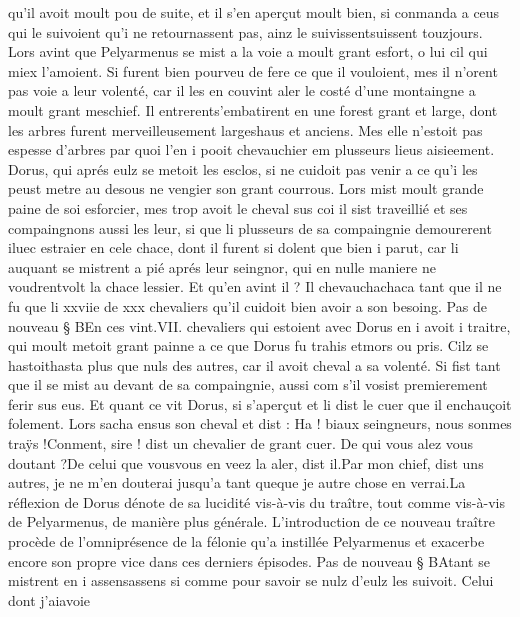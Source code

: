 \documentclass{article}
\begin{document}
\begin{pages}
   qu’il avoit moult pou de suite, et il s’en aperçut moult bien, si conmanda a ceus qui le suivoient qu’i ne retournassent pas, 
   ainz le suivissentsuissent touzjours. Lors avint que 
   Pelyarmenus se mist a la voie a moult grant esfort, o lui cil qui miex l’amoient. 
   Si furent bien pourveu de fere ce que il vouloient, mes il n’orent pas voie a leur volenté, car il les 
   en couvint aler le costé d’une montaingne a moult grant meschief. 
   Il entrerents'embatirent en une forest grant et large, dont les arbres 
   furent merveilleusement largeshaus et anciens. Mes elle n’estoit pas espesse 
   d’arbres par quoi l’en i pooit chevauchier em plusseurs lieus aisieement. 
   Dorus, qui aprés eulz se metoit les esclos, si ne cuidoit pas venir a ce qu’i les peust metre 
   au desous ne vengier son grant courrous. Lors mist moult grande paine de soi esforcier, mes trop avoit le cheval sus coi il 
   sist traveillié et ses compaingnons aussi les leur, si que li plusseurs de sa compaingnie demourerent iluec estraier en cele chace, 
   dont il furent si dolent que bien i parut, car li auquant se mistrent a pié aprés leur seingnor, 
   qui en nulle maniere ne voudrentvolt la chace lessier. Et qu’en avint il ? 
   Il chevauchachaca tant que il ne fu que li xxviie 
   de xxx chevaliers qu’il cuidoit bien avoir a son besoing. \pend
\pstart Pas de nouveau § BEn ces 
   vint.VII. 
   chevaliers qui estoient avec Dorus en i 
   avoit i traitre, qui moult metoit grant painne a ce que 
   Dorus fu trahis etmors ou pris. 
   Cilz se hastoithasta plus que nuls des autres, car il avoit cheval a sa volenté. Si fist tant que il se mist au devant de sa compaingnie, 
   aussi com s’il vosist premierement ferir sus eus. Et quant ce vit Dorus, si s’aperçut et 
   li dist le cuer que il enchauçoit folement. Lors sacha ensus son cheval et dist :
   Ha ! biaux seingneurs, nous sonmes traÿs !Conment, sire ! dist un chevalier de grant cuer. De qui vous alez vous doutant ?De celui que vousvous en veez la aler, 
      dist il.Par mon chief, dist uns autres, je ne m’en douterai jusqu’a tant 
      queque je autre chose en verrai.La 
      réflexion de Dorus dénote de sa lucidité vis-à-vis du traître, tout comme vis-à-vis de Pelyarmenus, de manière plus générale.
      L'introduction de ce nouveau traître procède de l'omniprésence de la félonie qu'a instillée Pelyarmenus et exacerbe encore
      son propre vice dans ces derniers épisodes. \pend
\pstart Pas de nouveau § BAtant se mistrent en i 
   assensassens si comme pour savoir se nulz d’eulz les suivoit. 
   Celui dont j’aiavoie 

\end{pages}
\end{document}
